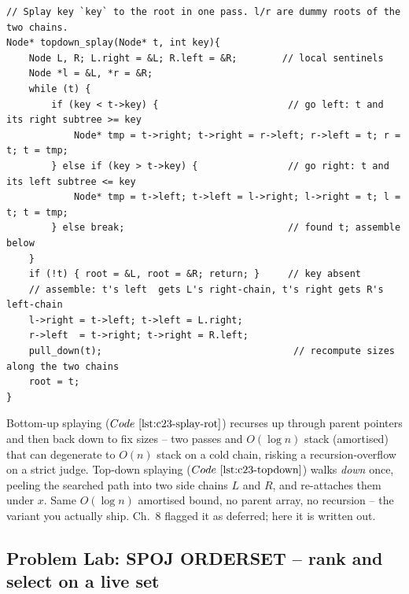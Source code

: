 \begin{lstlisting}[caption={Top-down splaying: one downward pass, no recursion, no parent pointers. Keys smaller than the walked-down spine accumulate on tree L, larger on tree R; x is re-attached at the end as the new root. ASCII only}, label={lst:c23-topdown}]
// Splay key `key` to the root in one pass. l/r are dummy roots of the two chains.
Node* topdown_splay(Node* t, int key){
    Node L, R; L.right = &L; R.left = &R;        // local sentinels
    Node *l = &L, *r = &R;
    while (t) {
        if (key < t->key) {                       // go left: t and its right subtree >= key
            Node* tmp = t->right; t->right = r->left; r->left = t; r = t; t = tmp;
        } else if (key > t->key) {                // go right: t and its left subtree <= key
            Node* tmp = t->left; t->left = l->right; l->right = t; l = t; t = tmp;
        } else break;                             // found t; assemble below
    }
    if (!t) { root = &L, root = &R; return; }     // key absent
    // assemble: t's left  gets L's right-chain, t's right gets R's left-chain
    l->right = t->left; t->left = L.right;
    r->left  = t->right; t->right = R.left;
    pull_down(t);                                  // recompute sizes along the two chains
    root = t;
}
\end{lstlisting}

\begin{insightbox}
Bottom-up splaying (\(\coderef{c23-splay-rot}\)) recurses up through parent
pointers and then back down to fix sizes -- two passes and \(O(\log n)\) stack
(amortised) that can degenerate to \(O(n)\) stack on a cold chain, risking a
recursion-overflow on a strict judge. Top-down splaying (\(\coderef{c23-topdown}\))
walks \emph{down} once, peeling the searched path into two side chains \(L\) and
\(R\), and re-attaches them under \(x\). Same \(O(\log n)\) amortised bound, no
parent array, no recursion -- the variant you actually ship. Ch.~8 flagged it as
deferred; here it is written out.
\end{insightbox}

\subsection{Problem Lab: SPOJ ORDERSET -- rank and select on a live set}

